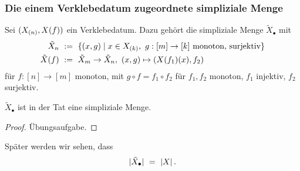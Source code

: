 \subsubsection{Die einem Verklebedatum zugeordnete simpliziale Menge}

Sei $(X_{(n)}, X(f))$ ein Verklebedatum. Dazu gehört die simpliziale Menge
$\tilde X_\bullet$ mit
\begin{align*}
  \tilde X_n \speq{&:=} \{ (x,g) \mid x\in X\subk k,\ g:[m]\to [k] 
    \text{ monoton, surjektiv}\}\\
  \tilde X(f) \speq{&:=} \tilde X_m \to \tilde X_n,\ 
    (x,g) \mapsto (X(f_1)(x), f_2)
\end{align*}
für $f: [n]\to [m]$ monoton, mit $g\circ f = f_1 \circ f_2$ für
$f_1,f_2$ monoton, $f_1$ injektiv, $f_2$ surjektiv.

\begin{lemma}
  $\tilde X_\bullet$ ist in der Tat eine simpliziale Menge.
\end{lemma}
\begin{proof}
  Übungsaufgabe.
\end{proof}

\begin{bemerkung}
  Später werden wir sehen, dass
  \[ |\tilde X_\bullet| \ =\  |X| \,.\]
\end{bemerkung}
